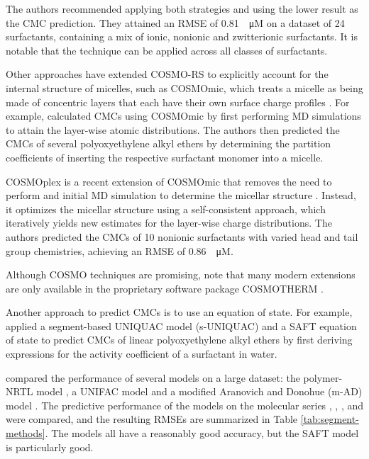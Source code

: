 The authors recommended applying both strategies and using the lower result as
the CMC prediction. They attained an RMSE of \SI{0.81}{\log \micro M} on a
dataset of 24 surfactants, containing a mix of ionic, nonionic and zwitterionic
surfactants. It is notable that the technique can be applied across all classes
of surfactants.

Other approaches have extended COSMO-RS to explicitly account for the internal
structure of micelles, such as COSMOmic, which treats a micelle as being made of
concentric layers that each have their own surface charge profiles
\cite{klamtCOSMOmicMechanisticApproach2008}. For example,
\citet{jakobtorweihenPredictingCriticalMicelle2017} calculated CMCs using
COSMOmic by first performing MD simulations to attain the layer-wise atomic
distributions. The authors then predicted the CMCs of several polyoxyethylene
alkyl ethers by determining the partition coefficients of inserting the
respective surfactant monomer into a micelle.

COSMOplex is a recent extension of COSMOmic that removes the need to perform and
initial MD simulation to determine the micellar structure
\cite{klamtCOSMOplexSelfconsistentSimulation2019}. Instead, it optimizes the
micellar structure using a self-consistent approach, which iteratively yields
new estimates for the layer-wise charge distributions. The authors predicted the
CMCs of 10 nonionic surfactants with varied head and tail group chemistries,
achieving an RMSE of \SI{0.86}{\log \micro M}.

Although COSMO techniques are promising,
\citet{herbertDielectricContinuumMethods2021} note that many modern extensions
are only available in the proprietary software package \textsc{COSMOTHERM}
\cite{eckertFastSolventScreening2002}.

Another approach to predict CMCs is to use an equation of state. For example,
\citet{liStudiesUNIQUACSAFT1998} applied a segment-based UNIQUAC model
(s-UNIQUAC) and a SAFT equation of state to predict CMCs of linear
polyoxyethylene alkyl ethers by first deriving expressions for the activity
coefficient of a surfactant in water.

\citet{chengCorrelationCriticalMicelle2005} compared the performance of several
models on a large dataset: the polymer-NRTL model
\cite{liStudiesUNIQUACSAFT1998}, a UNIFAC model
\cite{voutsasPredictionCriticalMicelle2001} and a modified Aranovich and Donohue
(m-AD) model \cite{chengCorrelationCriticalMicelle2005}. The predictive
performance of the models on the molecular series , ,
,  and  were compared, and the resulting RMSEs
are summarized in Table \ref{tab:segment-methods}. The models all have a
reasonably good accuracy, but the SAFT model is particularly good.

